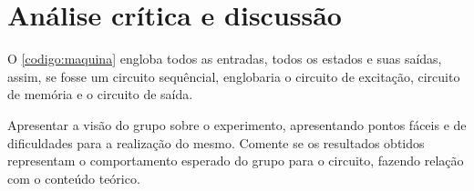 \chapter{Análise crítica e discussão}


O \autoref{codigo:maquina} engloba todos as entradas, todos os estados e suas saídas, assim,
se fosse um circuito sequêncial, englobaria o circuito de excitação, circuito de memória e o circuito
de saída.

Apresentar  a  visão do  grupo  sobre  o  experimento,  apresentando  pontos  fáceis  e
de  dificuldades  para  a  realização  do  mesmo.  Comente  se  os  resultados  obtidos
representam  o  comportamento  esperado   do   grupo   para  o   circuito,   fazendo
relação com o conteúdo teórico.
